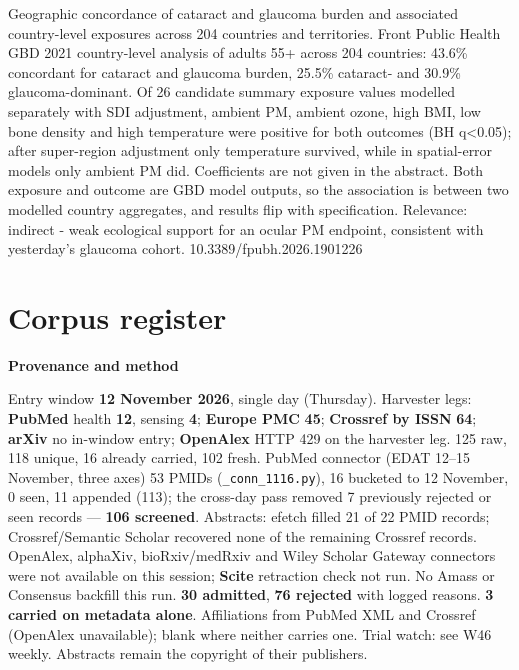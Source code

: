 \documentclass[10pt]{article}
\begin{document}
{Geographic concordance of cataract and glaucoma burden and associated country-level exposures across 204 countries and territories.}
{Front Public Health}
{GBD 2021 country-level analysis of adults 55+ across 204 countries: 43.6\% concordant for cataract and glaucoma burden, 25.5\% cataract- and 30.9\% glaucoma-dominant. Of 26 candidate summary exposure values modelled separately with SDI adjustment, ambient PM, ambient ozone, high BMI, low bone density and high temperature were positive for both outcomes (BH q<0.05); after super-region adjustment only temperature survived, while in spatial-error models only ambient PM did. Coefficients are not given in the abstract. Both exposure and outcome are GBD model outputs, so the association is between two modelled country aggregates, and results flip with specification. Relevance: indirect - weak ecological support for an ocular PM endpoint, consistent with yesterday's glaucoma cohort.}
{10.3389/fpubh.2026.1901226}

\clearpage
\section*{\sffamily\bfseries\color{Deep}Corpus register}
\vspace{-1.5mm}{\color{Amber}\rule{\linewidth}{1.1pt}}\vspace{2.5mm}



\vspace{2mm}

\begin{keybox}
{\sffamily\bfseries\footnotesize\color{Deep}Provenance and method}\\[1.2mm]
{\fontsize{7.2}{8.8}\selectfont
Entry window \textbf{12 November 2026}, single day (Thursday). Harvester legs: \textbf{PubMed} health \textbf{12}, sensing \textbf{4}; \textbf{Europe PMC} \textbf{45}; \textbf{Crossref by ISSN} \textbf{64}; \textbf{arXiv} no in-window entry; \textbf{OpenAlex} HTTP 429 on the harvester leg. 125 raw, 118 unique, 16 already carried, 102 fresh. PubMed connector (EDAT 12--15 November, three axes) 53 PMIDs (\texttt{\_conn\_1116.py}), 16 bucketed to 12 November, 0 seen, 11 appended (113); the cross-day pass removed 7 previously rejected or seen records --- \textbf{106 screened}. Abstracts: efetch filled 21 of 22 PMID records; Crossref/Semantic Scholar recovered none of the remaining Crossref records.
OpenAlex, alphaXiv, bioRxiv/medRxiv and Wiley Scholar Gateway connectors were not available on this session; \textbf{Scite} retraction check not run. No Amass or Consensus backfill this run.
\textbf{30 admitted}, \textbf{76 rejected} with logged reasons. \textbf{3 carried on metadata alone}. Affiliations from PubMed XML and Crossref (OpenAlex unavailable); blank where neither carries one. Trial watch: see W46 weekly.
Abstracts remain the copyright of their publishers.\par}
\end{keybox}
\end{document}
